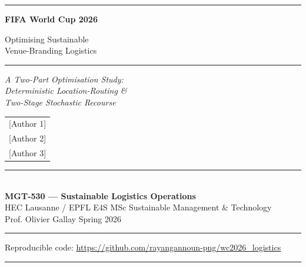 \documentclass[11pt,a4paper]{article}
\numberwithin{equation}{section}
\begin{document}

\begin{titlepage}
\thispagestyle{empty}
\centering
\vspace*{1cm}

{\color{NavyFIFA}\rule{\textwidth}{2pt}}
\vspace{1.2cm}

{\Huge\bfseries\sffamily\color{NavyFIFA}
FIFA World Cup 2026\par}
\vspace{0.4cm}
{\LARGE\sffamily\color{NavyFIFA}
Optimising Sustainable\\Venue-Branding Logistics\par}
\vspace{0.7cm}

{\color{LimeFIFA!70!NavyFIFA}\rule{0.5\textwidth}{1.4pt}}
\vspace{0.7cm}

{\large\itshape\color{GreyFIFA}
A Two-Part Optimisation Study:\\
Deterministic Location-Routing \&\\
Two-Stage Stochastic Recourse\par}

\vspace{1.8cm}

\begin{tabular}{c}
{\large [Author 1]}\\[2pt]
{\large [Author 2]}\\[2pt]
{\large [Author 3]}\\
\end{tabular}

\vspace{2.0cm}

{\color{NavyFIFA}\rule{0.7\textwidth}{0.6pt}}\\[8pt]
{\large\sffamily\color{NavyFIFA}\textbf{MGT-530 — Sustainable Logistics Operations}}\\[4pt]
{\normalsize\sffamily\color{GreyFIFA}HEC Lausanne / EPFL E4S \quad\textbf{\textbar}\quad MSc Sustainable Management \& Technology}\\[4pt]
{\normalsize\sffamily\color{GreyFIFA}Prof. Olivier Gallay \quad\textbf{\textbar}\quad Spring 2026}\\[8pt]
{\color{NavyFIFA}\rule{0.7\textwidth}{0.6pt}}

\vfill

{\small\color{GreyFIFA}
Reproducible code: \url{https://github.com/rayangannoun-png/wc2026_logistics}}

\vspace{0.6cm}
{\color{NavyFIFA}\rule{\textwidth}{2pt}}

\end{titlepage}
\end{document}
